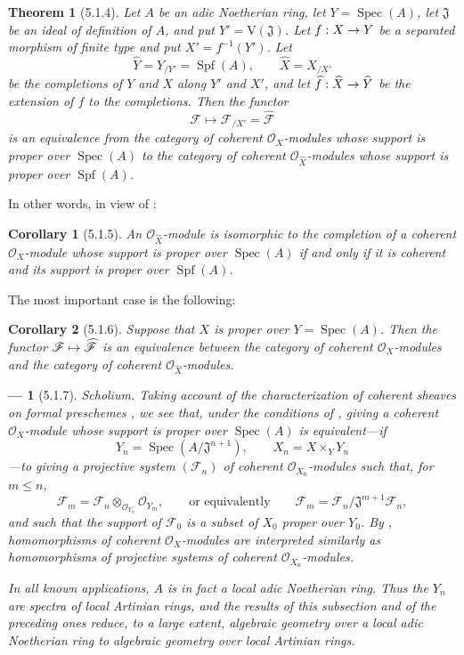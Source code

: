\documentclass[oneside]{amsart}
\theoremstyle{ega-env-style}
\newtheorem*{env}{---}
\theoremstyle{ega-thm-env-style}
\newtheorem*{theorem}{Theorem}
\newtheorem*{corollary}{Corollary}
\theoremstyle{ega-defn-env-style}
\def\mathcal{\mathscr}
\def\sh{\mathcal}                   %
\def\leq{\leqslant}                 %
\def\Spec{\operatorname{Spec}}
\def\Spf{\operatorname{Spf}}
\renewcommand{\to}{\mathchoice{\longrightarrow}{\rightarrow}{\rightarrow}{\rightarrow}}
\let\mapstoo\mapsto
\renewcommand{\mapsto}{\mathchoice{\longmapsto}{\mapstoo}{\mapstoo}{\mapstoo}}
\newcommand{\oldpage}[2][]{{\marginnote{\normalfont{\textbf{#1}~|~#2}}}\ignorespaces}
\let\EGAOriginalLabel\label
\renewcommand{\label}[1]{\phantomsection\EGAOriginalLabel{#1}}
\begin{document}
\begin{theorem}[5.1.4]
\label{III.5.1.4}
Let $A$ be an adic Noetherian ring, let $Y=\Spec(A)$, let
$\mathfrak{J}$ be an ideal of definition of $A$, and put
$Y'=\mathrm{V}(\mathfrak{J})$.  Let $f:X\to Y$ be a separated
morphism of finite type and put $X'=f^{-1}(Y')$.  Let
\[
  \widehat{Y}=Y_{/Y'}=\Spf(A),\qquad
  \widehat{X}=X_{/X'}
\]
be the completions of $Y$ and $X$ along $Y'$ and $X'$, and let
$\widehat{f}:\widehat{X}\to\widehat{Y}$ be the extension of $f$ to
the completions.  Then the functor
\[
  \sh{F}\longmapsto\sh{F}_{/X'}=\widehat{\sh{F}}
\]
is an equivalence from the category of coherent
$\sh{O}_X$-modules whose support is proper over $\Spec(A)$ to the
category of coherent $\sh{O}_{\widehat{X}}$-modules whose support
is proper over $\Spf(A)$.
\end{theorem}

In other words, in view of :

\begin{corollary}[5.1.5]
\label{III.5.1.5}
An $\sh{O}_{\widehat{X}}$-module is isomorphic to the completion of
a coherent $\sh{O}_X$-module whose support is proper over
$\Spec(A)$ if and only if it is coherent and its support is proper
over $\Spf(A)$.
\end{corollary}

The most important case is the following:

\begin{corollary}[5.1.6]
\label{III.5.1.6}
Suppose that $X$ is proper over $Y=\Spec(A)$.  Then the functor
$\sh{F}\mapsto\widehat{\sh{F}}$ is an equivalence between the
category of coherent $\sh{O}_X$-modules and the category of
coherent $\sh{O}_{\widehat{X}}$-modules.
\end{corollary}

\begin{env}[5.1.7]
\label{III.5.1.7}
\emph{Scholium.}
Taking account of the characterization of coherent sheaves on
formal preschemes , we see that, under the
conditions of , giving a coherent
$\sh{O}_X$-module whose support is proper over $\Spec(A)$ is
equivalent---if
\[
  Y_n=\Spec(A/\mathfrak{J}^{n+1}),\qquad
  X_n=X\times_Y Y_n
\]
---to giving a projective system $(\sh{F}_n)$ of coherent
$\sh{O}_{X_n}$-modules such that, for $m\leq n$,
\[
  \sh{F}_m
  =
  \sh{F}_n\otimes_{\sh{O}_{Y_n}}\sh{O}_{Y_m},
  \qquad\text{or equivalently}\qquad
  \sh{F}_m
  =
  \sh{F}_n/\mathfrak{J}^{m+1}\sh{F}_n,
\]
and such that the support of $\sh{F}_0$ is a subset of $X_0$
proper over $Y_0$.  By , homomorphisms of
coherent $\sh{O}_X$-modules are interpreted similarly as
homomorphisms of projective systems of coherent
$\sh{O}_{X_n}$-modules.

\oldpage[III]{151}

In all known applications, $A$ is in fact a local adic Noetherian
ring.  Thus the $Y_n$ are spectra of local Artinian rings, and the
results of this subsection and of the preceding ones reduce, to a
large extent, algebraic geometry over a local adic Noetherian ring
to algebraic geometry over local Artinian rings.
\end{env}
\end{document}
